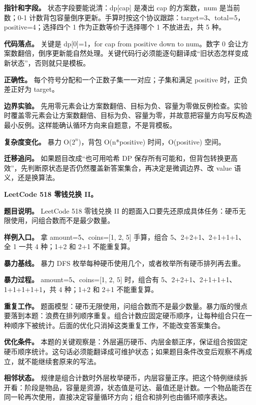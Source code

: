 \textbf{指针和字段。} 状态字段要能说清：dp[cap] 是凑出 cap 的方案数，num 是当前数；0-1 计数背包容量倒序更新。手算时按这个协议跟踪：target=3、total=5，positive=4；选择四个 1 作为正数等价于选择哪个 1 不放进去，共 5 种。

\textbf{代码落点。} 关键是 dp[0]=1，for cap from positive down to num。数字 0 会让方案数翻倍，倒序更新能自然处理。关键代码行必须能逐句翻译成“旧状态怎样变成新状态”，否则就只是模板。

\textbf{正确性。} 每个符号分配和一个正数子集一一对应；子集和满足 positive 时，正负差正好为 target。

\textbf{边界实验。} 先用零元素会让方案数翻倍、目标为负、容量为零做反例检查。实验时覆盖零元素会让方案数翻倍、目标为负、容量为零，并故意把容量方向写反构造最小反例。这样能确认循环方向来自题意，不是背模板。

\textbf{复杂度变化。} 暴力 O(\ensuremath{2^{n}})，背包 O(n*positive) 时间，O(positive) 空间。

\textbf{迁移追问。} 如果题目改成“也可用哈希 DP 保存所有可能和，但背包转换更高效”，先判断原状态是否仍然覆盖新答案集合，再决定是微调边界、改 value 语义，还是换算法。

\noindent\textbf{LeetCode 518 零钱兑换 II。}

\textbf{题目说明。} LeetCode 518 零钱兑换 II 的题面入口要先还原成具体任务：硬币无限使用，问组合数而不是最少数量。

\textbf{样例入口。} 拿 amount=5、coins=[1, 2, 5] 手算，组合 5、2+2+1、2+1+1+1、全 1 一共 4 种；1+2 和 2+1 不能重复算。

\textbf{暴力基线。} 暴力 DFS 枚举每种硬币使用几个，或者枚举所有硬币排列再去重。

\textbf{暴力过程。} amount=5、coins=[1, 2, 5] 时，组合有 5、2+2+1、2+1+1+1、1+1+1+1+1，共 4 种；1+2 和 2+1 不能重复算。

\textbf{重复工作。} 题面模型：硬币无限使用，问组合数而不是最少数量。暴力版的慢点要落到本题：浪费在排列顺序重复。组合计数应固定硬币顺序，让每种组合只在一种顺序下被统计。后面的优化只消掉这类重复工作，不能改变答案集合。

\textbf{优化条件。} 本题的关键观察是：外层遍历硬币、内层金额正序，保证组合按固定硬币顺序统计。这句话必须能翻译成可维护状态；如果题目条件改变后观察不再成立，就不能继续套原来的写法。

\textbf{相邻状态。} 规律是组合计数时外层枚举硬币，内层容量正序。把这个特例继续拆开看：阶段是物品，容量是资源，状态值是可达、最值还是计数。一个物品能否在同一轮再次使用，直接决定容量循环方向；组合和排列也由循环顺序表达。

